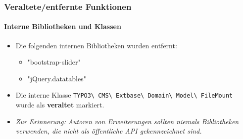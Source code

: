 \begin{frame}[fragile]
	\frametitle{Veraltete/entfernte Funktionen}
	\framesubtitle{Interne Bibliotheken und Klassen}

	\begin{itemize}
		\item Die folgenden internen Bibliotheken wurden entfernt:
			\begin{itemize}
				\item "bootstrap-slider"
				\item "jQuery.datatables"
			\end{itemize}
			\vspace{0.4cm}

		\item Die interne Klasse \small\texttt{TYPO3\textbackslash
			CMS\textbackslash
			Extbase\textbackslash
			Domain\textbackslash
			Model\textbackslash
			FileMount}\normalsize\newline
			wurde als \textbf{veraltet} markiert.

	\end{itemize}

	\vspace{0.6cm}
	\begin{itemize}
		\item[\ding{228}] \textit{Zur Erinnerung:} \textit{Autoren von Erweiterungen sollten niemals Bibliotheken verwenden, die nicht als öffentliche API gekennzeichnet sind.}
	\end{itemize}

\end{frame}



